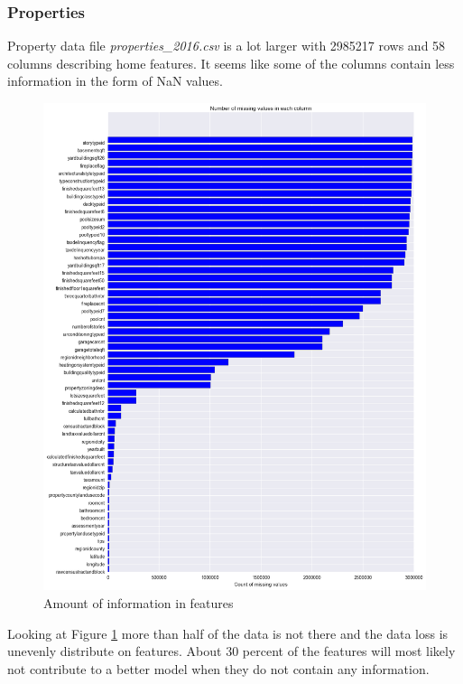 \documentclass[a4paper]{article}
\begin{document}
\subsubsection{Properties}
Property data file \textit{properties\_2016.csv} is a lot larger with 2985217 rows and 58 columns describing home
features. It seems like some of the columns contain less information in the form of NaN values.
\begin{figure}
\centering
\includegraphics[width=1\textwidth]{./img/prop-nan.png}
\caption{\label{fig:prop-nan} Amount of information in features}
\end{figure}
Looking at Figure \ref{fig:prop-nan} more than half of the data is not there and the
data loss is unevenly distribute on features. About 30 percent of the features will
most likely not contribute to a better model when they do not contain any information.
\end{document}
